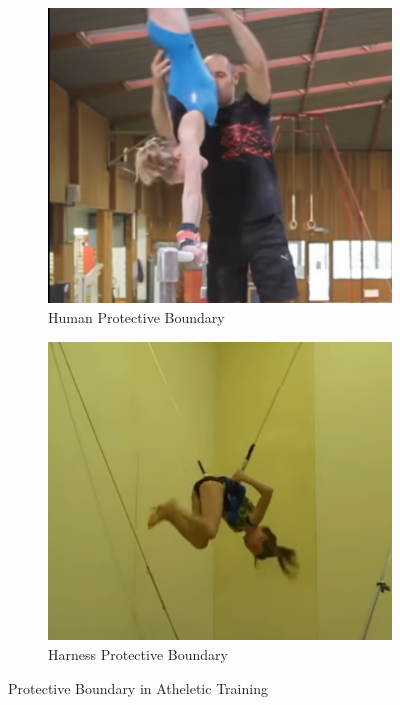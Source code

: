\documentclass[journal]{IEEEtran}
\begin{document}
\begin{figure}[H]
\centering
\begin{subfigure}{0.25\textwidth}
  \centering
  \includegraphics[width=\linewidth]{training1.png}
  \caption{Human Protective Boundary}
\end{subfigure}%
\begin{subfigure}{.25\textwidth}
  \centering
  \includegraphics[width=\linewidth]{training2.png}
  \caption{Harness Protective Boundary}
\end{subfigure}
\caption{Protective Boundary in Atheletic Training}
\label{fig:athelet}
\end{figure}
\end{document}
